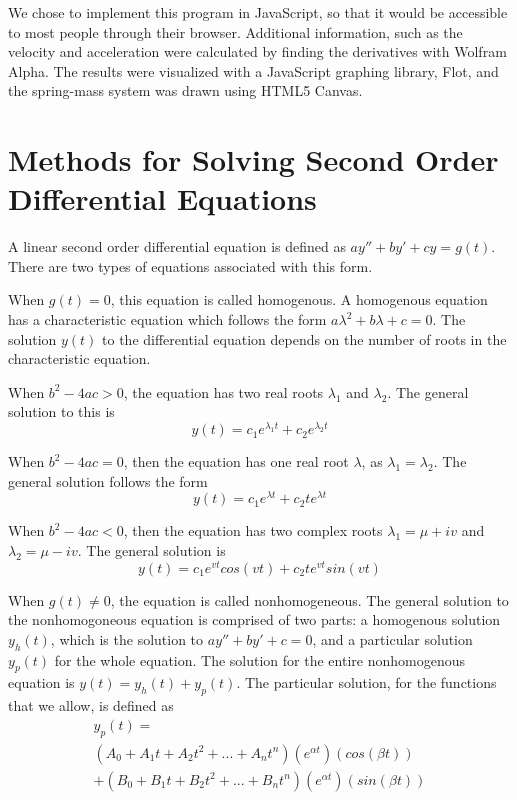 \documentclass[11pt]{article} %
\begin{document}
\begin{multicols}{2}
\begin{flushleft}
We chose to implement this program in JavaScript, so that it would be accessible to most people through their browser. Additional information, such as the velocity and acceleration were calculated by finding the derivatives with Wolfram Alpha. The results were visualized with a JavaScript graphing library, Flot, and the spring-mass system was drawn using HTML5 Canvas.


\section {Methods for Solving Second Order Differential Equations}

A linear second order differential equation is defined as $ay'' + by' + cy = g(t)$. There are two types of equations associated with this form.

When $g(t) = 0$, this equation is called homogenous. A homogenous equation has a characteristic equation which follows the form $a\lambda^2 + b\lambda + c = 0$. The solution $y(t)$ to the differential equation depends on the number of roots in the characteristic equation.

When $b^2 - 4ac > 0$, the equation has two real roots $\lambda_1$ and $\lambda_2$. The general solution to this is
\begin{equation}
y(t) = c_1e^{\lambda_1t} + c_2e^{\lambda_2t}
\end{equation}

When $b^2 - 4ac = 0$, then the equation has one real root $\lambda$, as $\lambda_1 = \lambda_2$. The general solution follows the form
\begin{equation}
y(t) = c_1e^{{\lambda}t} + c_2te^{{\lambda}t}
\end{equation}

When $b^2 - 4ac < 0$, then the equation has two complex roots $\lambda_1 = \mu + iv$ and $\lambda_2 = \mu - iv$. The general solution is 
\begin{equation}
y(t) = c_1e^{vt}cos(vt) + c_2te^{vt}sin(vt)
\end{equation}

When $g(t) \neq 0$, the equation is called nonhomogeneous. The general solution to the nonhomogoneous equation is comprised of two parts: a homogenous solution $y_h(t)$, which is the solution to $ay'' + by' + c = 0$, and a particular solution $y_p(t)$ for the whole equation. The solution for the entire nonhomogenous equation is $y(t) = y_h(t) + y_p(t)$. The particular solution, for the functions that we allow, is defined as
\begin{equation} \label{eq:generalized}
\begin{split}
y_p(t)=\\(A_0 + A_1t + A_2t^2 + ... + A_nt^n)(e^{{\alpha}t})(cos({\beta}t))\\+ (B_0 + B_1t + B_2t^2 + ... + B_nt^n)(e^{{\alpha}t})(sin({\beta}t))
\end{split}
\end{equation}


\end{flushleft}
\end{multicols}
\end{document}
